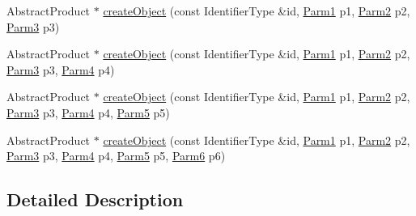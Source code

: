 \begin{DoxyCompactItemize}
\item 
Abstract\+Product $\ast$ \mbox{\hyperlink{classUtil_1_1ObjectFactory_aad312d47c1cd31a138d6e22cc80d398b}{create\+Object}} (const Identifier\+Type \&id, \mbox{\hyperlink{classUtil_1_1ObjectFactory_a47e4f863537be7a4f5f5972691bb0b57}{Parm1}} p1, \mbox{\hyperlink{classUtil_1_1ObjectFactory_ae438d0c17d1510e6fd7db9ac479a371f}{Parm2}} p2, \mbox{\hyperlink{classUtil_1_1ObjectFactory_ae5c679dd2f210e0a5ad257b336f754fb}{Parm3}} p3)
\item 
Abstract\+Product $\ast$ \mbox{\hyperlink{classUtil_1_1ObjectFactory_ab8a1b44d8067c263fce0b4bd94f95ba0}{create\+Object}} (const Identifier\+Type \&id, \mbox{\hyperlink{classUtil_1_1ObjectFactory_a47e4f863537be7a4f5f5972691bb0b57}{Parm1}} p1, \mbox{\hyperlink{classUtil_1_1ObjectFactory_ae438d0c17d1510e6fd7db9ac479a371f}{Parm2}} p2, \mbox{\hyperlink{classUtil_1_1ObjectFactory_ae5c679dd2f210e0a5ad257b336f754fb}{Parm3}} p3, \mbox{\hyperlink{classUtil_1_1ObjectFactory_a052f09d9e81b11d98bb53a52f327cf01}{Parm4}} p4)
\item 
Abstract\+Product $\ast$ \mbox{\hyperlink{classUtil_1_1ObjectFactory_a5d085366c8d5d743bfc1745b02a4f4db}{create\+Object}} (const Identifier\+Type \&id, \mbox{\hyperlink{classUtil_1_1ObjectFactory_a47e4f863537be7a4f5f5972691bb0b57}{Parm1}} p1, \mbox{\hyperlink{classUtil_1_1ObjectFactory_ae438d0c17d1510e6fd7db9ac479a371f}{Parm2}} p2, \mbox{\hyperlink{classUtil_1_1ObjectFactory_ae5c679dd2f210e0a5ad257b336f754fb}{Parm3}} p3, \mbox{\hyperlink{classUtil_1_1ObjectFactory_a052f09d9e81b11d98bb53a52f327cf01}{Parm4}} p4, \mbox{\hyperlink{classUtil_1_1ObjectFactory_a11006cc1ea90957dd8e5604c2d9e069d}{Parm5}} p5)
\item 
Abstract\+Product $\ast$ \mbox{\hyperlink{classUtil_1_1ObjectFactory_a552e3347f54a8ccd4409e718b1e96422}{create\+Object}} (const Identifier\+Type \&id, \mbox{\hyperlink{classUtil_1_1ObjectFactory_a47e4f863537be7a4f5f5972691bb0b57}{Parm1}} p1, \mbox{\hyperlink{classUtil_1_1ObjectFactory_ae438d0c17d1510e6fd7db9ac479a371f}{Parm2}} p2, \mbox{\hyperlink{classUtil_1_1ObjectFactory_ae5c679dd2f210e0a5ad257b336f754fb}{Parm3}} p3, \mbox{\hyperlink{classUtil_1_1ObjectFactory_a052f09d9e81b11d98bb53a52f327cf01}{Parm4}} p4, \mbox{\hyperlink{classUtil_1_1ObjectFactory_a11006cc1ea90957dd8e5604c2d9e069d}{Parm5}} p5, \mbox{\hyperlink{classUtil_1_1ObjectFactory_a9f80d25e0964c0e4c204373cd651397a}{Parm6}} p6)
\end{DoxyCompactItemize}


\subsection{Detailed Description}
